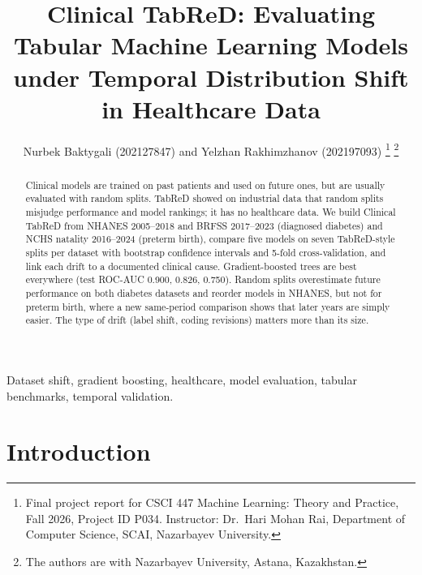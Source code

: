 \documentclass[journal,twoside,web]{ieeecolor}
\begin{document}
\title{Clinical TabReD: Evaluating Tabular Machine Learning Models under Temporal Distribution Shift in Healthcare Data}
\author{Nurbek Baktygali (202127847) and Yelzhan Rakhimzhanov (202197093)
\thanks{Final project report for CSCI 447 Machine Learning: Theory and Practice, Fall 2026,
Project ID P034. Instructor: Dr.~Hari Mohan Rai, Department of Computer Science, SCAI,
Nazarbayev University.}
\thanks{The authors are with Nazarbayev University, Astana, Kazakhstan.}}

\maketitle

\begin{abstract}
Clinical models are trained on past patients and used on future ones, but are usually evaluated
with random splits. TabReD showed on industrial data that random splits misjudge performance and
model rankings; it has no healthcare data. We build Clinical TabReD from NHANES 2005--2018 and BRFSS
2017--2023 (diagnosed diabetes) and NCHS natality 2016--2024 (preterm birth), compare five models
on seven TabReD-style splits per dataset with bootstrap confidence intervals and 5-fold
cross-validation, and link each drift to a documented clinical cause. Gradient-boosted trees are
best everywhere (test ROC-AUC 0.900, 0.826, 0.750). Random splits overestimate future performance
on both diabetes datasets and reorder models in NHANES, but not for preterm birth, where a new
same-period comparison shows that later years are simply easier. The type of drift (label shift,
coding revisions) matters more than its size.
\end{abstract}

\begin{IEEEkeywords}
Dataset shift, gradient boosting, healthcare, model evaluation, tabular benchmarks, temporal validation.
\end{IEEEkeywords}

\section{Introduction}
\label{sec:intro}
\end{document}
